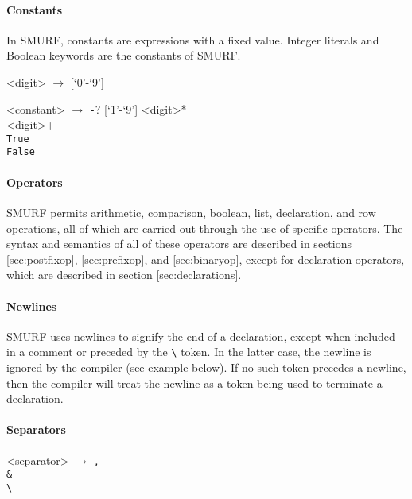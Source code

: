 \paragraph{Constants}
\label{sec:constants}
In SMURF, constants are expressions with a fixed value. Integer literals and
Boolean keywords are the constants of SMURF. 

\setlength{\grammarindent}{6em}
\begin{grammar}
<digit> $\rightarrow$ [`0'-`9'] 

<constant> $\rightarrow$ \texttt{-}? [`1'-`9'] <digit>* \\
												 <digit>+ \\
												\texttt{True} \\
												\texttt{False}
\end{grammar}

\paragraph{Operators}
SMURF permits arithmetic, comparison, boolean, list, declaration, and row operations, all of which
are carried out through the use of specific operators. The syntax and semantics of all of these
operators are described in sections \ref{sec:postfixop}, \ref{sec:prefixop}, and \ref{sec:binaryop},
except for declaration operators, which are described in section \ref{sec:declarations}.


\paragraph{Newlines}
SMURF uses newlines to signify the end of a declaration, except
when included in a comment or preceded by the \texttt{\textbackslash} token. In the latter case, the newline is ignored by the compiler 
(see example below). If no such token precedes a newline, then the compiler will treat the newline as
a token being used to terminate a declaration.

\paragraph{Separators}

\begin{grammar}
<separator> $\rightarrow$ \texttt{,} \\
												  \texttt{\&} \\
													\texttt{\textbackslash}
\end{grammar}


